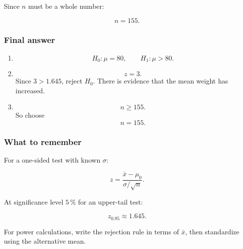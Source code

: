 \documentclass[10pt]{article}
\begin{document}
Since $n$ must be a whole number:

\[
n=155.
\]

\subsubsection*{Final answer}
\begin{enumerate}[label=\alph*)]
\item
\[
H_0:\mu=80,
\qquad
H_1:\mu>80.
\]

\item
\[
z=3.
\]
Since $3>1.645$, reject $H_0$.
There is evidence that the mean weight has increased.

\item
\[
n\geq 155.
\]
So choose
\[
n=155.
\]
\end{enumerate}

\subsubsection*{What to remember}
For a one-sided test with known $\sigma$:

\[
z=
\frac{\bar{x}-\mu_0}{\sigma/\sqrt{n}}.
\]

At significance level $5\,\%$ for an upper-tail test:

\[
z_{0.95}\approx 1.645.
\]

For power calculations, write the rejection rule in terms of
$\bar{x}$, then standardize using the alternative mean.
\end{document}

